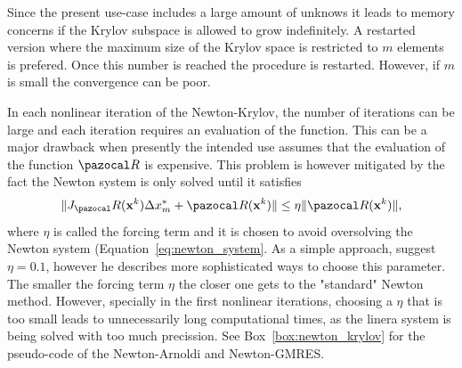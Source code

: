 Since the present use-case includes a large amount of unknows it leads to memory concerns if the Krylov subspace is allowed to grow indefinitely.
A restarted version where the maximum size of the Krylov space is restricted to \(m\) elements is prefered.
Once this number is reached the procedure is restarted.
However, if \(m\) is small the convergence can be poor.

In each nonlinear iteration of the Newton-Krylov, the number of iterations can be large and each iteration requires an evaluation of the function.
This can be a major drawback when presently the intended use assumes that the evaluation of the function \(\pazocal R\) is expensive.
This problem is however mitigated by the fact the Newton system is only solved until it satisfies
\begin{equation}
  \|J_\pazocal R(\mathbf x^k) \Delta x^*_m+ \pazocal R(\mathbf x^k)\| \leq \eta\|\pazocal R(\mathbf x^k)\|,
\end{equation}
where \(\eta\) is called the forcing term and it is chosen to avoid oversolving the Newton system (Equation~\eqref{eq:newton_system}.
As a simple approach, \cite{kelley_solving_2003} suggest \(\eta=0.1\), however he describes more sophisticated ways to choose this parameter.
The smaller the forcing term \(\eta\) the closer one gets to the "standard" Newton method.
However, specially in the first nonlinear iterations, choosing a \(\eta\) that is too small leads to unnecessarily long computational times, as the linera system is being solved with too much precission.
See Box~\ref{box:newton_krylov} for the pseudo-code of the Newton-Arnoldi and Newton-GMRES.

